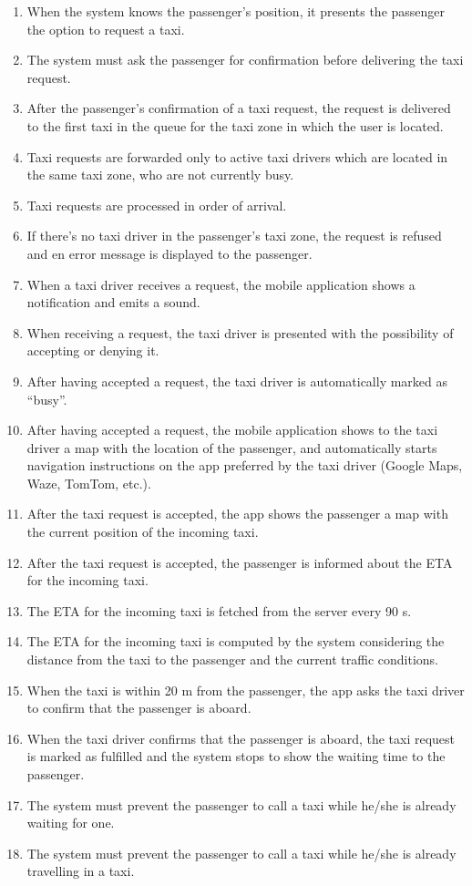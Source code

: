 \begin{enumerate}
	\item When the system knows the passenger's position, it presents the passenger the option to request a taxi.
	\item The system must ask the passenger for confirmation before delivering the taxi request.
	\item After the passenger's confirmation of a taxi request, the request is delivered to the first taxi in the queue for the taxi zone in which the user is located.
	\item Taxi requests are forwarded only to active taxi drivers which are located in the same taxi zone, who are not currently busy.
	\item Taxi requests are processed in order of arrival.
	\item If there's no taxi driver in the passenger's taxi zone, the request is refused and en error message is displayed to the passenger.
	\item When a taxi driver receives a request, the mobile application shows a notification and emits a sound.
	\item When receiving a request, the taxi driver is presented with the possibility of accepting or denying it.
	\item After having accepted a request, the taxi driver is automatically marked as ``busy''.
	\item After having accepted a request, the mobile application shows to the taxi driver a map with the location of the passenger, and automatically starts navigation instructions on the app preferred by the taxi driver (Google Maps, Waze, TomTom, etc.).
	\item After the taxi request is accepted, the app shows the passenger a map with the current position of the incoming taxi.
	\item After the taxi request is accepted, the passenger is informed about the ETA for the incoming taxi.
	\item The ETA for the incoming taxi is fetched from the server every 90 s.
	\item The ETA for the incoming taxi is computed by the system considering the distance from the taxi to the passenger and the current traffic conditions.
	\item When the taxi is within 20 m from the passenger, the app asks the taxi driver to confirm that the passenger is aboard.
	\item When the taxi driver confirms that the passenger is aboard, the taxi request is marked as fulfilled and the system stops to show the waiting time to the passenger.
	\item The system must prevent the passenger to call a taxi while he/she is already waiting for one.
	\item The system must prevent the passenger to call a taxi while he/she is already travelling in a taxi.
\end{enumerate}
